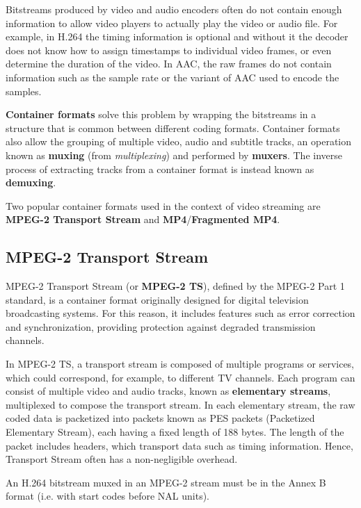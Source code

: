Bitstreams produced by video and audio encoders often do not contain enough information to allow video players to actually play the video or audio file. For example, in H.264 the timing information is optional and without it the decoder does not know how to assign timestamps to individual video frames, or even determine the duration of the video.\cite{h264itu} In AAC, the raw frames do not contain information such as the sample rate or the variant of AAC used to encode the samples.\cite{aac}

\textbf{Container formats} solve this problem by wrapping the bitstreams in a structure that is common between different coding formats. Container formats also allow the grouping of multiple video, audio and subtitle tracks, an operation known as \textbf{muxing} (from \textit{multiplexing}) and performed by \textbf{muxers}. The inverse process of extracting tracks from a container format is instead known as \textbf{demuxing}.

Two popular container formats used in the context of video streaming are \textbf{MPEG-2 Transport Stream} and \textbf{MP4}/\textbf{Fragmented MP4}.

\subsection{MPEG-2 Transport Stream}
\label{sec:bg/containers/mpeg2ts}

MPEG-2 Transport Stream (or \textbf{MPEG-2 TS}), defined by the MPEG-2 Part 1 standard, is a container format originally designed for digital television broadcasting systems. For this reason, it includes features such as error correction and synchronization, providing protection against degraded transmission channels.

In MPEG-2 TS, a transport stream is composed of multiple programs or services, which could correspond, for example, to different TV channels. Each program can consist of multiple video and audio tracks, known as \textbf{elementary streams}, multiplexed to compose the transport stream. In each elementary stream, the raw coded data is packetized into packets known as PES packets (Packetized Elementary Stream), each having a fixed length of 188 bytes. The length of the packet includes headers, which transport data such as timing information. Hence, Transport Stream often has a non-negligible overhead.\cite{mpeg2ts}

An H.264 bitstream muxed in an MPEG-2 stream must be in the Annex B format (i.e. with start codes before NAL units).

